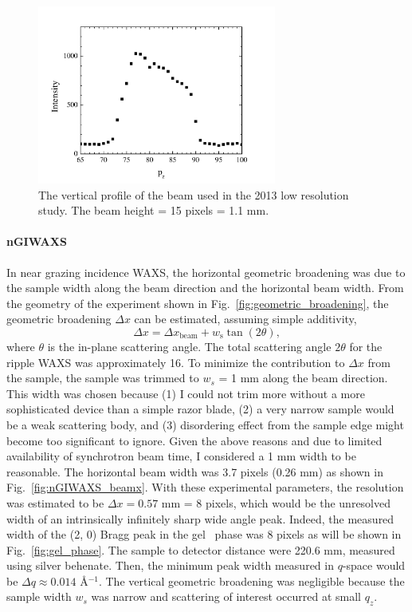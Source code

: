 \begin{figure}[p]
  \centering
  \includegraphics[width=0.7\textwidth]{figures/ripple/MMs/laxs/beamz_lr}
  \caption{The vertical profile of the beam used in the 2013 low resolution study.
  The beam height = 15 pixels = 1.1 mm.}
  \label{fig:ripple_lr_beamz}
\end{figure}

\paragraph{nGIWAXS}
In near grazing incidence WAXS, 
the horizontal geometric broadening was due to the
sample width along the beam direction and the horizontal beam width.
From the geometry of the experiment shown in Fig.~\ref{fig:geometric_broadening}, 
the geometric broadening $\Delta x$ can be estimated,
assuming simple additivity,
\[
\Delta x = \Delta x_\textrm{beam} + w_\textrm{s}\tan(2\theta),
\] 
where $\theta$ is the in-plane scattering angle.
The total scattering angle $2\theta$ for the ripple WAXS was approximately 
16\textdegree. 
To minimize the contribution to $\Delta x$ from the sample, 
the sample was trimmed to $w_s$ = 1 mm along the beam direction. 
This width was chosen because (1) I could not trim more
without a more sophisticated device than a simple razor blade, (2) a very
narrow sample would be a weak scattering body, and (3) disordering effect from 
the sample edge might become too significant to ignore. 
Given the above reasons and due to limited availability
of synchrotron beam time, I considered a 1 mm width to be reasonable.
The horizontal beam width was 3.7 pixels (0.26 mm) as shown in
Fig.~\ref{fig:nGIWAXS_beamx}.
With these experimental parameters, 
the resolution was estimated to be $\Delta x = 0.57$ mm = 8 pixels, 
which would be the unresolved width of an intrinsically infinitely sharp 
wide angle peak.
Indeed, the measured width of the (2, 0) Bragg peak in the gel \LbetaI\ phase
was 8 pixels as will be shown in Fig.~\ref{fig:gel_phase}.
The sample to detector distance were 220.6 mm, measured using silver behenate.
Then, the minimum peak width measured in $q$-space would be
$\Delta q \approx 0.014$ \AA$^{-1}$. The vertical geometric broadening 
was negligible because the sample width $w_s$ was narrow and scattering
of interest occurred at small $q_z$.

